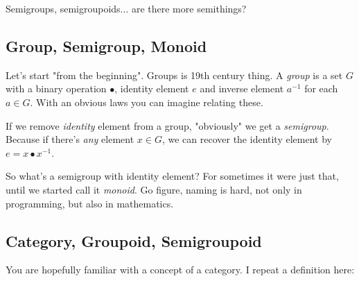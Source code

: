 \documentclass{article}
\begin{document}
Semigroups, semigroupoids... are there more semithings?

\subsection{Group, Semigroup, Monoid}

Let's start "from the beginning". Groups is 19th century thing.  A \emph{group}
is a set $G$ with a binary operation $\bullet$, identity element $e$ and
inverse element $a^{-1}$ for each $a \in G$.
With an obvious laws you can imagine relating these.

If we remove \emph{identity} element from a group, "obviously" we get a \emph{semigroup}.
Because if there's \emph{any} element $x \in G$, we can recover the identity
element by $e = x \bullet x^{-1}$.

So what's a semigroup with identity element? For sometimes it were just that,
until we started call it \emph{monoid}. Go figure, naming is hard, not only in
programming, but also in mathematics.

\subsection{Category, Groupoid, Semigroupoid}

You are hopefully familiar with a concept of a category.
I repeat a definition here:
\end{document}
